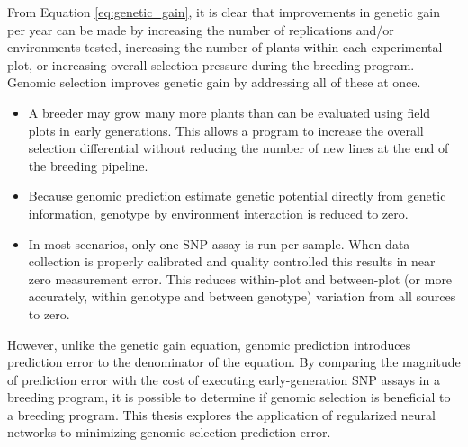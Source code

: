 From Equation \ref{eq:genetic_gain}, it is clear that improvements in genetic gain per year can
be made by increasing the number of replications and/or environments tested, increasing the 
number of plants within each experimental plot, or increasing overall selection pressure 
during the breeding program. Genomic selection improves genetic gain by addressing 
all of these at once.

\begin{itemize}
    \item A breeder may grow many more plants than can be evaluated using field plots in 
          early generations. This allows a program to increase the overall selection 
          differential without reducing the number of new lines at the end of the breeding pipeline.
    \item Because genomic prediction estimate genetic potential directly from genetic information,
          genotype by environment interaction is reduced to zero.
    \item In most scenarios, only one SNP assay is run per sample. When data collection is properly
          calibrated and quality controlled this results in near zero measurement error. This reduces
          within-plot and between-plot (or more accurately, within genotype and between genotype) 
          variation from all sources to zero.
\end{itemize}

However, unlike the genetic gain equation, genomic prediction introduces prediction error to the 
denominator of the equation. By comparing the magnitude of prediction error with the cost
of executing early-generation SNP assays in a breeding program, it is possible to determine
if genomic selection is beneficial to a breeding program. This thesis explores the application 
of regularized neural networks to minimizing genomic selection prediction error. 






